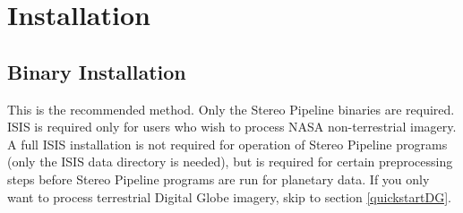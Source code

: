 \chapter{Installation}

\section{Binary Installation}

This is the recommended method. Only the Stereo Pipeline binaries
are required. ISIS is required only for users who wish to process
NASA non-terrestrial imagery.  A full ISIS installation is not
required for operation of Stereo Pipeline programs (only the ISIS
data directory is needed), but is required for certain preprocessing
steps before Stereo Pipeline programs are run for planetary data.
If you only want to process terrestrial Digital Globe imagery, skip
to section \ref{quickstartDG}.

